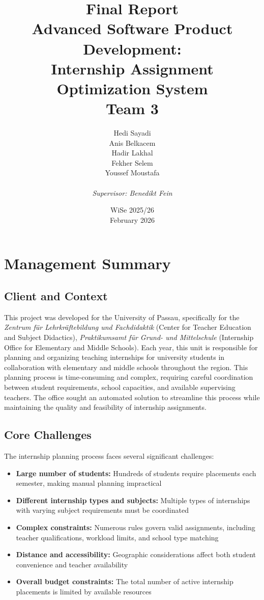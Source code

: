 \documentclass[12pt,a4paper]{report}
\title{
    \vspace{2cm}
    {\Huge \textbf{Final Report}} \\
    \vspace{1.5cm}
    {\Large Advanced Software Product Development:} \\
    \vspace{0.3cm}
    {\Large Internship Assignment Optimization System} \\
    \vspace{2cm}
    {\large Team 3}
}
\author{
    Hedi Sayadi \\
    Anis Belkacem \\
    Hadir Lakhal \\
    Fekher Selem \\
    Youssef Moustafa \\
    \vspace{1cm}
    \\
    \textit{Supervisor: Benedikt Fein}
}
\date{
    \vspace{1cm}
    WiSe 2025/26 \\ 
    \vspace{0.2cm}
    February 2026
}
\begin{document}
\maketitle

\chapter*{Management Summary}

\section*{Client and Context}
This project was developed for the University of Passau, specifically for the \textit{Zentrum für Lehrkräftebildung und Fachdidaktik} (Center for Teacher Education and Subject Didactics), \textit{Praktikumsamt für Grund- und Mittelschule} (Internship Office for Elementary and Middle Schools).
\newline
Each year, this unit is responsible for planning and organizing teaching internships for university students in collaboration with elementary and middle schools throughout the region. This planning process is time-consuming and complex, requiring careful coordination between student requirements, school capacities, and available supervising teachers. The office sought an automated solution to streamline this process while maintaining the quality and feasibility of internship assignments.

\section*{Core Challenges}
The internship planning process faces several significant challenges:
\begin{itemize}
    \item \textbf{Large number of students:} Hundreds of students require placements each semester, making manual planning impractical
    \item \textbf{Different internship types and subjects:} Multiple types of internships with varying subject requirements must be coordinated
    \item \textbf{Complex constraints:} Numerous rules govern valid assignments, including teacher qualifications, workload limits, and school type matching
    \item \textbf{Distance and accessibility:} Geographic considerations affect both student convenience and teacher availability
    \item \textbf{Overall budget constraints:} The total number of active internship placements is limited by available resources
\end{itemize}
\end{document}
